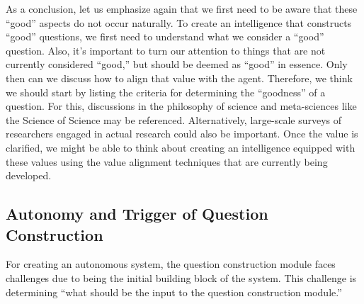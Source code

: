 As a conclusion, let us emphasize again that we first need to be aware that these ``good'' aspects do not occur naturally. To create an intelligence that constructs ``good'' questions, we first need to understand what we consider a ``good'' question. Also, it's important to turn our attention to things that are not currently considered ``good,'' but should be deemed as ``good'' in essence. Only then can we discuss how to align that value with the agent. Therefore, we think we should start by listing the criteria for determining the ``goodness'' of a question. For this, discussions in the philosophy of science and meta-sciences like the Science of Science may be referenced. Alternatively, large-scale surveys of researchers engaged in actual research could also be important. Once the value is clarified, we might be able to think about creating an intelligence equipped with these values using the value alignment techniques that are currently being developed.



\subsection{Autonomy and Trigger of Question Construction}
For creating an autonomous system, the question construction module faces challenges due to being the initial building block of the system. This challenge is determining ``what should be the input to the question construction module.''

